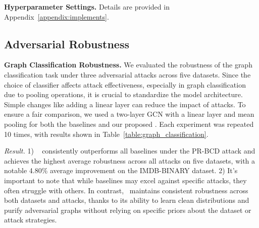 \noindent\textbf{Hyperparameter Settings.} Details are provided in Appendix~\ref{appendix:implements}.



\subsection{Adversarial Robustness}
\textbf{Graph Classification Robustness.}
We evaluated the robustness of the graph classification task under three adversarial attacks across five datasets. Since the choice of classifier affects attack effectiveness, especially in graph classification due to pooling operations, it is crucial to standardize the model architecture. Simple changes like adding a linear layer can reduce the impact of attacks. To ensure a fair comparison, we used a two-layer GCN with a linear layer and mean pooling for both the baselines and our proposed \ModelName. Each experiment was repeated 10 times, with results shown in Table~\ref{table:graph_classification}.

\textit{Result.} 1) \ModelName~ consistently outperforms all baselines under the PR-BCD attack and achieves the highest average robustness across all attacks on five datasets, with a notable 4.80\% average improvement on the IMDB-BINARY dataset.
2) It's important to note that while baselines may excel against specific attacks, they often struggle with others. In contrast, \ModelName\ maintains consistent robustness across both datasets and attacks, thanks to its ability to learn clean distributions and purify adversarial graphs without relying on specific priors about the dataset or attack strategies.


